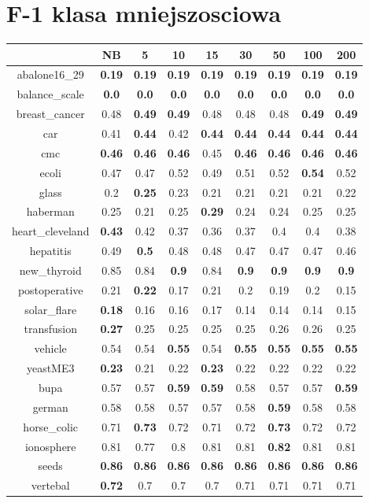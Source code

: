 \documentclass{article}%
\begin{document}
%
\section*{F{-}1 klasa mniejszosciowa}%
\begin{tabular}{c|cccccccc}%
\hline%
&NB&5&10&15&30&50&100&200\\%
\hline%
abalone16\_29&\textbf{0.19}&\textbf{0.19}&\textbf{0.19}&\textbf{0.19}&\textbf{0.19}&\textbf{0.19}&\textbf{0.19}&\textbf{0.19}\\%
\hline%
balance\_scale&\textbf{0.0}&\textbf{0.0}&\textbf{0.0}&\textbf{0.0}&\textbf{0.0}&\textbf{0.0}&\textbf{0.0}&\textbf{0.0}\\%
\hline%
breast\_cancer&0.48&\textbf{0.49}&\textbf{0.49}&0.48&0.48&0.48&\textbf{0.49}&\textbf{0.49}\\%
\hline%
car&0.41&\textbf{0.44}&0.42&\textbf{0.44}&\textbf{0.44}&\textbf{0.44}&\textbf{0.44}&\textbf{0.44}\\%
\hline%
cmc&\textbf{0.46}&\textbf{0.46}&\textbf{0.46}&0.45&\textbf{0.46}&\textbf{0.46}&\textbf{0.46}&\textbf{0.46}\\%
\hline%
ecoli&0.47&0.47&0.52&0.49&0.51&0.52&\textbf{0.54}&0.52\\%
\hline%
glass&0.2&\textbf{0.25}&0.23&0.21&0.21&0.21&0.21&0.22\\%
\hline%
haberman&0.25&0.21&0.25&\textbf{0.29}&0.24&0.24&0.25&0.25\\%
\hline%
heart\_cleveland&\textbf{0.43}&0.42&0.37&0.36&0.37&0.4&0.4&0.38\\%
\hline%
hepatitis&0.49&\textbf{0.5}&0.48&0.48&0.47&0.47&0.47&0.46\\%
\hline%
new\_thyroid&0.85&0.84&\textbf{0.9}&0.84&\textbf{0.9}&\textbf{0.9}&\textbf{0.9}&\textbf{0.9}\\%
\hline%
postoperative&0.21&\textbf{0.22}&0.17&0.21&0.2&0.19&0.2&0.15\\%
\hline%
solar\_flare&\textbf{0.18}&0.16&0.16&0.17&0.14&0.14&0.14&0.15\\%
\hline%
transfusion&\textbf{0.27}&0.25&0.25&0.25&0.25&0.26&0.26&0.25\\%
\hline%
vehicle&0.54&0.54&\textbf{0.55}&0.54&\textbf{0.55}&\textbf{0.55}&\textbf{0.55}&\textbf{0.55}\\%
\hline%
yeastME3&\textbf{0.23}&0.21&0.22&\textbf{0.23}&0.22&0.22&0.22&0.22\\%
\hline%
bupa&0.57&0.57&\textbf{0.59}&\textbf{0.59}&0.58&0.57&0.57&\textbf{0.59}\\%
\hline%
german&0.58&0.58&0.57&0.57&0.58&\textbf{0.59}&0.58&0.58\\%
\hline%
horse\_colic&0.71&\textbf{0.73}&0.72&0.71&0.72&\textbf{0.73}&0.72&0.72\\%
\hline%
ionosphere&0.81&0.77&0.8&0.81&0.81&\textbf{0.82}&0.81&0.81\\%
\hline%
seeds&\textbf{0.86}&\textbf{0.86}&\textbf{0.86}&\textbf{0.86}&\textbf{0.86}&\textbf{0.86}&\textbf{0.86}&\textbf{0.86}\\%
\hline%
vertebal&\textbf{0.72}&0.7&0.7&0.7&0.71&0.71&0.71&0.71\\%
\hline%
\end{tabular}
\end{document}

